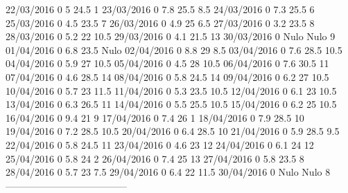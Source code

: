 22/03/2016  0      5      24.5   1 
23/03/2016  0      7.8    25.5   8.5 
24/03/2016  0      7.3    25.5   6 
25/03/2016  0      4.5    23.5   7 
26/03/2016  0      4.9    25     6.5 
27/03/2016  0      3.2    23.5   8 
28/03/2016  0      5.2    22     10.5 
29/03/2016  0      4.1    21.5   13 
30/03/2016  0     Nulo   Nulo    9 
01/04/2016  0      6.8    23.5  Nulo
02/04/2016  0      8.8    29     8.5 
03/04/2016  0      7.6    28.5   10.5 
04/04/2016  0      5.9    27     10.5 
05/04/2016  0      4.5    28     10.5 
06/04/2016  0      7.6    30.5   11 
07/04/2016  0      4.6    28.5   14 
08/04/2016  0      5.8    24.5   14 
09/04/2016  0      6.2    27     10.5 
10/04/2016  0      5.7    23     11.5 
11/04/2016  0      5.3    23.5   10.5 
12/04/2016  0      6.1    23     10.5 
13/04/2016  0      6.3    26.5   11 
14/04/2016  0      5.5    25.5   10.5 
15/04/2016  0      6.2    25     10.5 
16/04/2016  0      9.4    21     9 
17/04/2016  0      7.4    26     1 
18/04/2016  0      7.9    28.5   10 
19/04/2016  0      7.2    28.5   10.5 
20/04/2016  0      6.4    28.5   10 
21/04/2016  0      5.9    28.5   9.5 
22/04/2016  0      5.8    24.5   11 
23/04/2016  0      4.6    23     12 
24/04/2016  0      6.1    24     12 
25/04/2016  0      5.8    24     2 
26/04/2016  0      7.4    25     13 
27/04/2016  0      5.8    23.5   8 
28/04/2016  0      5.7    23     7.5 
29/04/2016  0      6.4    22     11.5 
30/04/2016  0     Nulo   Nulo    8 
--------------------------------------
